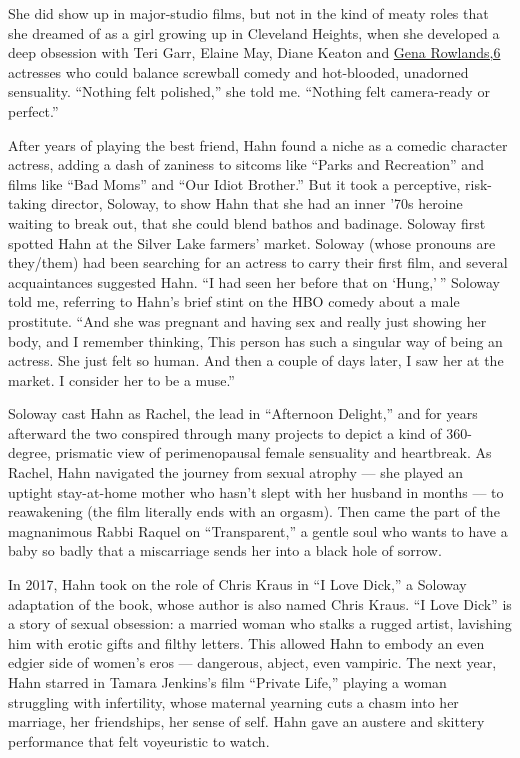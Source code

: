 She did show up in major-studio films, but not in the kind of meaty
roles that she dreamed of as a girl growing up in Cleveland Heights,
when she developed a deep obsession with Teri Garr, Elaine May, Diane
Keaton and \href{http://nytimes3xbfgragh.onion\#tooltip-6}{Gena
Rowlands,6} actresses who could balance screwball comedy and
hot-blooded, unadorned sensuality. ``Nothing felt polished,'' she told
me. ``Nothing felt camera-ready or perfect.''

After years of playing the best friend, Hahn found a niche as a comedic
character actress, adding a dash of zaniness to sitcoms like ``Parks and
Recreation'' and films like ``Bad Moms'' and ``Our Idiot Brother.'' But
it took a perceptive, risk-taking director, Soloway, to show Hahn that
she had an inner '70s heroine waiting to break out, that she could blend
bathos and badinage. Soloway first spotted Hahn at the Silver Lake
farmers' market. Soloway (whose pronouns are they/them) had been
searching for an actress to carry their first film, and several
acquaintances suggested Hahn. ``I had seen her before that on `Hung,' ''
Soloway told me, referring to Hahn's brief stint on the HBO comedy about
a male prostitute. ``And she was pregnant and having sex and really just
showing her body, and I remember thinking, This person has such a
singular way of being an actress. She just felt so human. And then a
couple of days later, I saw her at the market. I consider her to be a
muse.''

Soloway cast Hahn as Rachel, the lead in ``Afternoon Delight,'' and for
years afterward the two conspired through many projects to depict a kind
of 360-degree, prismatic view of perimenopausal female sensuality and
heartbreak. As Rachel, Hahn navigated the journey from sexual atrophy
--- she played an uptight stay-at-home mother who hasn't slept with her
husband in months --- to reawakening (the film literally ends with an
orgasm). Then came the part of the magnanimous Rabbi Raquel on
``Transparent,'' a gentle soul who wants to have a baby so badly that a
miscarriage sends her into a black hole of sorrow.

In 2017, Hahn took on the role of Chris Kraus in ``I Love Dick,'' a
Soloway adaptation of the book, whose author is also named Chris Kraus.
``I Love Dick'' is a story of sexual obsession: a married woman who
stalks a rugged artist, lavishing him with erotic gifts and filthy
letters. This allowed Hahn to embody an even edgier side of women's eros
--- dangerous, abject, even vampiric. The next year, Hahn starred in
Tamara Jenkins's film ``Private Life,'' playing a woman struggling with
infertility, whose maternal yearning cuts a chasm into her marriage, her
friendships, her sense of self. Hahn gave an austere and skittery
performance that felt voyeuristic to watch.

